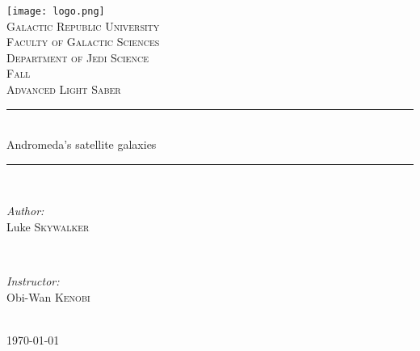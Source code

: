 \documentclass[a4paper]{article}
\begin{document}
\begin{titlepage}

\newcommand{\HRule}{\rule{\linewidth}{0.5mm}} %
\center %

\texttt{[image: logo.png]}\\[0.5cm] %

\textsc{\LARGE Galactic Republic University}\\[0.5cm] %
\textsc{\Large Faculty of Galactic Sciences}\\[0.5cm] %
\textsc{\Large Department of Jedi Science}\\[0.5cm] %
\textsc{\Large Fall}\\[0.3cm] %
\textsc{\large Advanced Light Saber}\\[2.5cm] %

\HRule \\[0.4cm]
{\LARGE  Andromeda's satellite galaxies}\\[0.2cm] %
\HRule \\[0.4cm]

\begin{minipage}{0.4\textwidth}
\begin{flushleft} \large
\emph{Author:}\\
Luke \textsc{Skywalker} %
\end{flushleft}
\end{minipage}
~
\begin{minipage}{0.4\textwidth}
\begin{flushright} \large
\emph{Instructor:} \\
Obi-Wan \textsc{Kenobi} %
\end{flushright}
\end{minipage}\\[6cm]

{\large \today}\\[3cm] %
 
\vfill %

\end{titlepage}


\tableofcontents
 
\newpage
\end{document}

